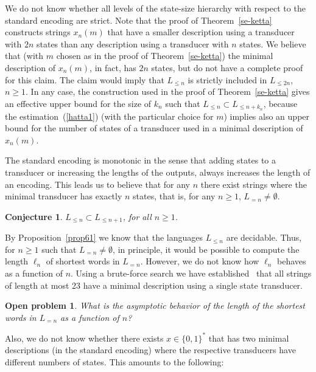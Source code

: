\documentclass[copyright]{eptcs}
\newtheorem{open}{Open problem}
\newtheorem{conjecture}[theorem]{Conjecture}
\begin{document}
We do not know whether all levels of the state-size hierarchy
with respect to the standard encoding are strict.
Note that the proof of Theorem~\ref{se-ketta} constructs
strings $x_n(m)$ 
that have a smaller description
using a transducer with $2n$ states than any description
using a transducer with $n$ states. 
We believe that (with $m$ chosen as in the proof of Theorem~\ref{se-ketta})
the minimal description of $x_n(m)$, in fact, has $2n$ states,
but do not have a complete proof for this claim.
The claim would imply
that $L_{\leq n}$ is strictly included in $L_{\leq 2n}$, $n \geq 1$.
In any case, the construction used in the proof of
Theorem~\ref{se-ketta} gives an effective upper bound for the
size of $k_n$ such that $L_{ \leq n} \subset L_{ \leq n + k_n}$,
because the estimation~(\ref{hatta1}) (with the particular
choice for $m$) implies also an
upper bound for the number of states
of a transducer used in a minimal description of $x_n(m)$.

The standard encoding is monotonic in the sense that  adding
states to a transducer or increasing the lengths of the outputs,
always increases the length of an encoding. This leads us to believe
that for any $n$ there exist strings where the minimal transducer has
exactly $n$ states, that is, 
for any $n \geq 1$, $L_{= n } \neq \emptyset$.

\begin{conjecture}
\label{se-ketta3}
$L_{\leq n} \subset L_{\leq n+1}$, for all $n \geq 1$.
\end{conjecture}

By Proposition~\ref{prop61} we know that the languages
$L_{\leq n}$ are decidable. 
Thus, for $n \geq 1$ such  that $L_{=n} \neq \emptyset$, 
in principle, it would be possible to compute
the  length $\ell_n$ of shortest words in $L_{=n}$.
However, we do not know how
$\ell_n$ behaves as a function of $n$. Using a brute-force
search we have established~\cite{CSR} that all strings of length at most
23 have a minimal description  using a single
state transducer.


\begin{open}
\label{pituus}
What is the asymptotic behavior of the length of the shortest words
in $L_{=n}$ 
as a function
of $n$?
\end{open}

Also, we do not know whether there exists $x \in \{ 0, 1 \}^*$
that has two minimal descriptions 
(in the standard encoding) where the respective transducers
have different numbers of states. This amounts to the following:
\end{document}
